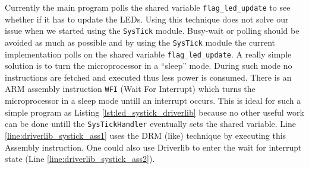 Currently the main program polls the shared variable \texttt{flag\_led\_update} to see whether if it has to update the LEDs.
Using this technique does not solve our issue when we started using the \texttt{SysTick} module.
Busy-wait or polling should be avoided as much as possible and by using the \texttt{SysTick} module the current implementation polls on the shared variable \texttt{flag\_led\_update}.
A really simple solution is to turn the microprocessor in a \enquote{sleep} mode.
During such mode no instructions are fetched and executed thus less power is consumed.
There is an ARM assembly instruction \texttt{WFI} (Wait For Interrupt) which turns the microprocessor in a sleep mode untill an interrupt occurs.
This is ideal for such a simple program as Listing \ref{lst:led_systick_driverlib} because no other useful work can be done untill the \texttt{SysTickHandler} eventually sets the shared variable.
Line \ref{line:driverlib_systick_ass1} uses the DRM (like) technique by executing this Assembly instruction.
One could also use Driverlib to enter the wait for interrupt state (Line \ref{line:driverlib_systick_ass2}).

